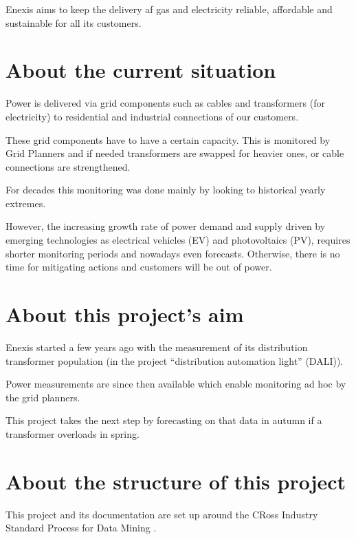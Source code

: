 \documentclass[letterpaper,10pt,english]{sphinxmanual}
\let\sphinxpxdimen\pdfpxdimen\else\newdimen\sphinxpxdimen
\begin{document}
Enexis aims to keep the delivery af gas and electricity reliable, affordable and sustainable for all its customers.


\section{About the current situation}
\label{\detokenize{general:about-the-current-situation}}
Power is delivered via grid components such as cables and transformers (for electricity) to residential and industrial connections of our customers.

These grid components have to have a certain capacity. This is monitored by Grid Planners and if needed transformers are swapped for heavier ones, or cable connections are strengthened.

For decades this monitoring was done mainly by looking to historical yearly extremes.

However, the increasing growth rate of power demand and supply driven by emerging technologies as electrical vehicles (EV) and photovoltaics (PV), requires shorter monitoring periods and nowadays even forecasts.
Otherwise, there is no time for mitigating actions and customers will be out of power.


\section{About this project’s aim}
\label{\detokenize{general:about-this-project-s-aim}}
Enexis started a few years ago with the measurement of its distribution transformer population (in the project “distribution automation light” (DALI)).

Power measurements are since then available which enable monitoring ad hoc by the grid planners.

This project takes the next step by forecasting on that data in autumn if a transformer overloads in spring.

\noindent{\hspace*{\fill}\sphinxincludegraphics[width=400\sphinxpxdimen]{{autumn_spring_load}.png}\hspace*{\fill}}


\section{About the structure of this project}
\label{\detokenize{general:about-the-structure-of-this-project}}
This project and its documentation are set up around the CRoss Industry Standard Process for Data Mining .
\end{document}
